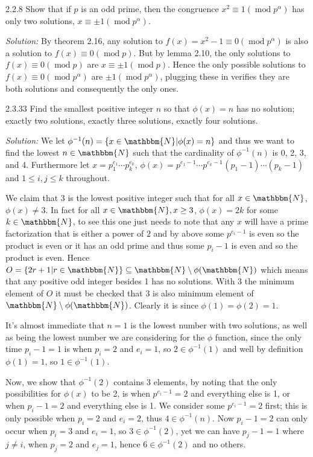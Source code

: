 \documentclass{letter}
\newcommand{\tmem}[1]{{\em #1\/}}
\newcommand{\tmop}[1]{\ensuremath{\operatorname{#1}}}
\begin{document}
2.2.8 Show that if $p$ is an odd prime, then the congruence $x^2 \equiv 1
(\tmop{mod} p^{\alpha})$ has only two solutions, $x \equiv \pm 1 (\tmop{mod}
p^{\alpha})$.

{\tmem{Solution:}} By theorem 2.16, any solution to $f (x) = x^2 - 1 \equiv 0
(\tmop{mod} p^{\alpha})$ is also a solution to $f (x) \equiv 0 (\tmop{mod}
p)$. But by lemma 2.10, the only solutions to $f (x) \equiv 0 (\tmop{mod} p)$
are $x \equiv \pm 1 (\tmop{mod} p)$. Hence the only possible solutions to $f
(x) \equiv 0 (\tmop{mod} p^{\alpha})$ are $\pm 1 (\tmop{mod} p^{\alpha})$,
plugging these in verifies they are both solutions and consequently the only
ones.

2.3.33 Find the smallest positive integer $n$ so that $\phi (x) = n$ has no
solution; exactly two solutions, exactly three solutions, exactly four
solutions.

{\tmem{Solution:}} We let $\phi^{- 1} (n) =\{x \in \mathbbm{N}| \phi (x) =
n\}$ and thus we want to find the lowest $n \in \mathbbm{N}$ such that the
cardinality of $\phi^{- 1} (n)$ is 0, 2, 3, and 4. Furthermore let $x =
p_1^{e_1} \cdots p_k^{e_k}$, $\phi (x) = p^{e_1 - 1} \cdots p^{e_k - 1_{}}
(p_1 - 1) \cdots (p_k - 1)$ and $1 \leq i, j \leq k$ throughout.

We claim that 3 is the lowest positive integer such that for all $x \in
\mathbbm{N}$, $\phi (x) \neq 3$. In fact for all $x \in \mathbbm{N}, x \geq
3$, $\phi (x) = 2 k$ for some $k \in \mathbbm{N}$, to see this one just needs
to note that any $x$ will have a prime factorization that is either a power of
$2$ and by above some $p^{e_i - 1}$ is even so the product is even or it has
an odd prime and thus some $p_i - 1$ is even and so the product is even. Hence
$O =\{2 r + 1 | r \in \mathbbm{N}\} \subseteq \mathbbm{N} \setminus \phi
(\mathbbm{N})$ which means that any positive odd integer besides 1 has no
solutions. With 3 the minimum element of $O$ it must be checked that $3$ is
also minimum element of $\mathbbm{N} \setminus \phi (\mathbbm{N})$. Clearly it
is since $\phi (1) = \phi (2) = 1$.

It's almost immediate that $n = 1$ is the lowest number with two solutions, as
well as being the lowest number we are considering for the $\phi$ function,
since the only time $p_i - 1 = 1$ is when $p_i = 2$ and $e_i = 1$, so $2 \in
\phi^{- 1} (1)$ and well by definition $\phi (1) = 1$, so $1 \in \phi^{- 1}
(1)$.

Now, we show that $\phi^{- 1} (2)$ contains 3 elements, by noting that the
only possibilities for $\phi (x)$ to be 2, is when $p^{e_i - 1} = 2$ and
everything else is 1, or when $p_i - 1 = 2$ and everything else is 1. We
consider some $p^{e_i - 1} = 2$ first; this is only possible when $p_i = 2$
and $e_i = 2$, thus $4 \in \phi^{- 1} (n)$. Now $p_i - 1 = 2$ can only occur
when $p_i = 3$ and $e_i = 1$, so $3 \in \phi^{- 1} (2)$, yet we can have $p_j
- 1 = 1$ where $j \neq i$, when $p_j = 2$ and $e_j = 1$, hence $6 \in \phi^{-
1} (2)$ and no others.
\end{document}

